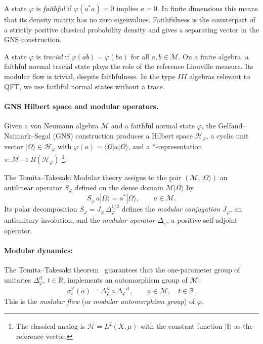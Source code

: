 \documentclass[a4paper,11pt]{article}
\theoremstyle{definition}
\newcommand{\id}{\mathbb{I}}
\begin{document}
A state $\varphi$ is \emph{faithful} if $\varphi(a^*a)=0$ implies $a=0$.
In finite dimensions this means that its density matrix has no zero eigenvalues.
Faithfulness is the counterpart of a strictly positive classical probability density
and gives a separating vector in the GNS construction.

A state $\varphi$ is \emph{tracial} if $\varphi(ab)=\varphi(ba)$ for all $a,b\in\mathcal M$.
On a finite algebra, a faithful normal tracial state plays the role of the reference
Liouville measure. Its modular flow is trivial, despite faithfulness. In the type $III$
algebras relevant to QFT, we use faithful normal states without a trace.

\paragraph{GNS Hilbert space and modular operators.}
Given a von Neumann algebra $\mathcal M$ and a faithful normal state $\varphi$, the
Gelfand--Naimark--Segal (GNS) construction produces a Hilbert space $\mathcal{H}_\varphi$,
a cyclic unit vector $|\Omega\rangle\in\mathcal{H}_\varphi$ with
$\varphi(a)=\langle\Omega|a|\Omega\rangle$, and a $*$-representation
$\pi:\mathcal M\to B(\mathcal{H}_\varphi)$ \footnote{The classical analog is $\mathcal{H}=L^2(X,\mu)$
with the constant function $|\id\rangle$ as the reference vector.}.

The Tomita--Takesaki Modular theory assigns to the pair $(\mathcal M,|\Omega\rangle)$ an
antilinear operator $S_\varphi$ defined on the dense domain
$\mathcal M|\Omega\rangle$ by
\begin{equation}
  S_\varphi\, a|\Omega\rangle = a^*|\Omega\rangle, \qquad a\in\mathcal M.
  \label{eq:Tomita-S}
\end{equation}
Its polar decomposition $S_\varphi = J_\varphi\,\Delta_\varphi^{1/2}$ defines the
\emph{modular conjugation} $J_\varphi$, an antiunitary involution, and the
\emph{modular operator} $\Delta_\varphi$, a positive self-adjoint operator. 

\paragraph{Modular dynamics:}
The Tomita--Takesaki theorem~\cite{Takesaki1970} guarantees that the one-parameter group
of unitaries $\Delta_\varphi^{it}$, $t\in\mathbb{R}$, implements an automorphism group of
$\mathcal M$:
\begin{equation}
  \sigma_t^\varphi(a) = \Delta_\varphi^{it}\, a\, \Delta_\varphi^{-it},
  \qquad a\in\mathcal M,\quad t\in\mathbb{R}.
  \label{eq:modular-flow}
\end{equation}
This is the \emph{modular flow} (or \emph{modular automorphism group}) of $\varphi$. 
\end{document}
